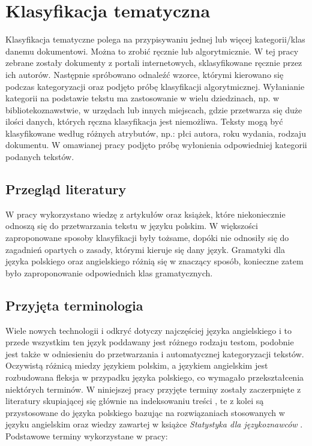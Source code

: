 \chapter{Klasyfikacja tematyczna}
Klasyfikacja tematyczne polega na przypisywaniu jednej lub więcej kategorii/klas danemu dokumentowi. Można to zrobić ręcznie lub algorytmicznie. W tej pracy zebrane zostały dokumenty z portali internetowych, sklasyfikowane ręcznie przez ich autorów. Następnie spróbowano odnaleźć wzorce, którymi kierowano się podczas kategoryzacji oraz podjęto próbę klasyfikacji algorytmicznej. Wyłanianie kategorii na podstawie tekstu ma zastosowanie w wielu dziedzinach, np. w bibliotekoznawstwie, w urzędach lub innych miejscach, gdzie przetwarza się duże ilości danych, których ręczna klasyfikacja jest niemożliwa.\cite{text-classification-stanford} Teksty mogą być klasyfikowane według różnych atrybutów, np.: płci autora, roku wydania, rodzaju dokumentu. W omawianej pracy podjęto próbę wyłonienia odpowiedniej kategorii podanych tekstów. 
\section{Przegląd literatury}
W pracy wykorzystano wiedzę z artykułów oraz książek, które niekoniecznie odnoszą się do przetwarzania tekstu w języku polskim. W większości zaproponowane sposoby klasyfikacji były tożsame, dopóki nie odnosiły się do zagadnień opartych o zasady, którymi kieruje się dany język. Gramatyki dla języka polskiego oraz angielskiego różnią się w znaczący sposób, konieczne zatem było zaproponowanie odpowiednich klas gramatycznych. \cite{polishGrammarTagset} 

\section{Przyjęta terminologia}
Wiele nowych technologii i odkryć dotyczy najczęściej języka angielskiego i to przede wszystkim ten język poddawany jest różnego rodzaju testom, podobnie jest także w odniesieniu do przetwarzania i automatycznej kategoryzacji tekstów. Oczywistą różnicą miedzy językiem polskim, a językiem angielskim jest rozbudowana fleksja w przypadku języka polskiego, co wymagało przekształcenia niektórych terminów. W niniejszej pracy przyjęte terminy zostały zaczerpnięte z literatury skupiającej się głównie na indeksowaniu treści \cite{indeksowanietresci}, te z kolei są przystosowane do języka polskiego bazując na rozwiązaniach stosowanych w języku angielskim oraz wiedzy zawartej w książce \textit{Statystyka dla językoznawców} \cite{stats}. Podstawowe terminy wykorzystane w pracy:

